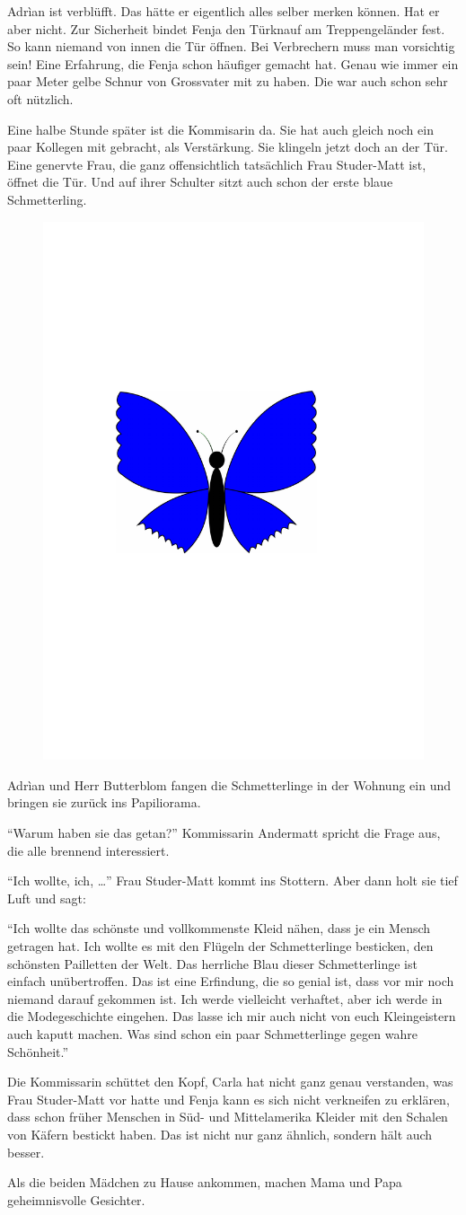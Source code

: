 Adrìan ist verblüfft. Das hätte er eigentlich alles selber merken können. Hat er aber nicht. Zur Sicherheit bindet Fenja den Türknauf am Treppengeländer fest. So kann niemand von innen die Tür öffnen. Bei Verbrechern muss man vorsichtig sein! Eine Erfahrung, die Fenja schon häufiger gemacht hat. Genau wie immer ein paar Meter gelbe Schnur von Grossvater mit zu haben. Die war auch schon sehr oft nützlich. 

Eine halbe Stunde später ist die Kommisarin da. Sie hat auch gleich noch ein paar Kollegen mit gebracht, als Verstärkung. Sie klingeln jetzt doch an der Tür. Eine genervte Frau, die ganz offensichtlich tatsächlich Frau Studer-Matt ist, öffnet die Tür. Und auf ihrer Schulter sitzt auch schon der erste blaue Schmetterling.
\begin{figure}[H]
\centering
\includegraphics[width=.05\textwidth]{bilder/inkling.pdf}
\end{figure}
Adrìan und Herr Butterblom fangen die Schmetterlinge in der Wohnung ein und bringen sie zurück ins Papiliorama. 

\enquote{Warum haben sie das getan?} Kommissarin Andermatt spricht die Frage aus, die alle brennend interessiert.

\enquote{Ich wollte, ich, \dots} Frau Studer-Matt kommt ins Stottern. Aber dann holt sie tief Luft und sagt: 

\enquote{Ich wollte das schönste und vollkommenste Kleid nähen, dass je ein Mensch getragen hat. Ich wollte es mit den Flügeln der Schmetterlinge besticken, den schönsten Pailletten der Welt. Das herrliche Blau dieser Schmetterlinge ist einfach unübertroffen. Das ist eine Erfindung, die so genial ist, dass vor mir noch niemand darauf gekommen ist. Ich werde vielleicht verhaftet, aber ich werde in die Modegeschichte eingehen. Das lasse ich mir auch nicht von euch Kleingeistern auch kaputt machen. Was sind schon ein paar Schmetterlinge gegen wahre Schönheit.}

Die Kommissarin schüttet den Kopf, Carla hat nicht ganz genau verstanden, was Frau Studer-Matt vor hatte und Fenja kann es sich nicht verkneifen zu erklären, dass schon früher Menschen in Süd- und Mittelamerika Kleider mit den Schalen von Käfern bestickt haben. Das ist nicht nur ganz ähnlich, sondern hält auch besser. 

Als die beiden Mädchen zu Hause ankommen, machen Mama und Papa geheimnisvolle Gesichter. 

